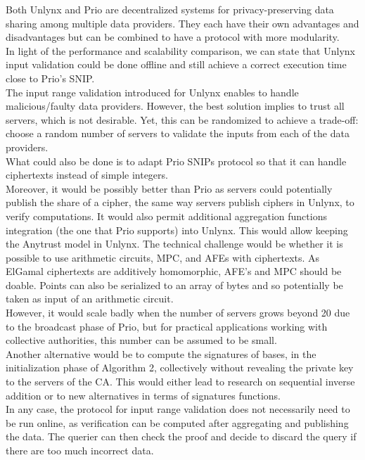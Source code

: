 \documentclass{article}
\begin{document}
Both Unlynx and Prio are decentralized systems for privacy-preserving data sharing among multiple data providers. They each have their own advantages and disadvantages but can be combined to have a protocol with more modularity.\\
In light of the performance and scalability comparison, we can state that Unlynx input validation could be done offline and still achieve a correct execution time close to Prio's SNIP.\\
The input range validation introduced for Unlynx enables to handle malicious/faulty data providers. However, the best solution implies to trust all servers, which is not desirable. Yet, this can be randomized to achieve a trade-off: choose a random number of servers to validate the inputs from each of the data providers.\\
What could also be done is to adapt Prio SNIPs protocol so that it can handle ciphertexts instead of simple integers.\\
Moreover, it would be possibly better than Prio as servers could potentially publish the share of a cipher, the same way servers publish ciphers in Unlynx, to verify computations. It would also permit additional aggregation functions integration (the one that Prio supports) into Unlynx. This would allow keeping the Anytrust model in Unlynx. The technical challenge would be whether it is possible to use arithmetic circuits, MPC, and AFEs with ciphertexts. As ElGamal ciphertexts are additively homomorphic, AFE's and MPC should be doable. Points can also be serialized to an array of bytes and so potentially be taken as input of an arithmetic circuit.\\
However, it would scale badly when the number of servers grows beyond 20 due to the broadcast phase of Prio, but for practical applications working with collective authorities, this number can be assumed to be small.\\
Another alternative would be to compute the signatures of bases, in the initialization phase of Algorithm 2, collectively without revealing the private key to the servers of the CA. This would either lead to research on sequential inverse addition or to new alternatives in terms of signatures functions.\\

In any case, the protocol for input range validation does not necessarily need to be run online, as verification can be computed after aggregating and publishing the data. The querier can then check the proof and decide to discard the query if there are too much incorrect data.\\
\end{document}
